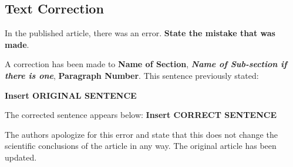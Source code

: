 \documentclass[utf8]{frontiers_correction}
\begin{document}
\vspace{5mm}
\subsection*{Text Correction}
In the published article, there was an error. \textbf{State the mistake that was made}.\par
A correction has been made to \textbf{Name of Section}, \textbf{\textit{Name of Sub-section if there is one}}, \textbf{Paragraph Number}. This sentence previously stated:\par
\textbf{Insert ORIGINAL SENTENCE}\par 
The corrected sentence appears below:
\textbf{Insert CORRECT SENTENCE}\par 
The authors apologize for this error and state that this does not change the scientific conclusions of the article in any way. The original article has been updated.






\end{document}
